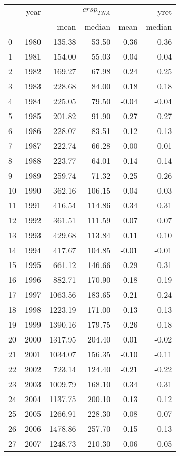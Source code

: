 \begin{tabular}{lrrrrr}
\toprule
 & year & \multicolumn{2}{r}{$crsp_{TNA}$} & \multicolumn{2}{r}{yret} \\
 &  & mean & median & mean & median \\
\midrule
0 & 1980 & 135.38 & 53.50 & 0.36 & 0.36 \\
1 & 1981 & 154.00 & 55.03 & -0.04 & -0.04 \\
2 & 1982 & 169.27 & 67.98 & 0.24 & 0.25 \\
3 & 1983 & 228.68 & 84.00 & 0.18 & 0.18 \\
4 & 1984 & 225.05 & 79.50 & -0.04 & -0.04 \\
5 & 1985 & 201.82 & 91.90 & 0.27 & 0.27 \\
6 & 1986 & 228.07 & 83.51 & 0.12 & 0.13 \\
7 & 1987 & 222.74 & 66.28 & 0.00 & 0.01 \\
8 & 1988 & 223.77 & 64.01 & 0.14 & 0.14 \\
9 & 1989 & 259.74 & 71.32 & 0.25 & 0.26 \\
10 & 1990 & 362.16 & 106.15 & -0.04 & -0.03 \\
11 & 1991 & 416.54 & 114.86 & 0.34 & 0.31 \\
12 & 1992 & 361.51 & 111.59 & 0.07 & 0.07 \\
13 & 1993 & 429.68 & 113.84 & 0.11 & 0.10 \\
14 & 1994 & 417.67 & 104.85 & -0.01 & -0.01 \\
15 & 1995 & 661.12 & 146.66 & 0.29 & 0.31 \\
16 & 1996 & 882.71 & 170.90 & 0.18 & 0.19 \\
17 & 1997 & 1063.56 & 183.65 & 0.21 & 0.24 \\
18 & 1998 & 1223.19 & 171.00 & 0.13 & 0.13 \\
19 & 1999 & 1390.16 & 179.75 & 0.26 & 0.18 \\
20 & 2000 & 1317.95 & 204.40 & 0.01 & -0.02 \\
21 & 2001 & 1034.07 & 156.35 & -0.10 & -0.11 \\
22 & 2002 & 723.14 & 124.40 & -0.21 & -0.22 \\
23 & 2003 & 1009.79 & 168.10 & 0.34 & 0.31 \\
24 & 2004 & 1137.75 & 200.10 & 0.13 & 0.12 \\
25 & 2005 & 1266.91 & 228.30 & 0.08 & 0.07 \\
26 & 2006 & 1478.86 & 257.70 & 0.15 & 0.13 \\
27 & 2007 & 1248.73 & 210.30 & 0.06 & 0.05 \\

\end{tabular}

